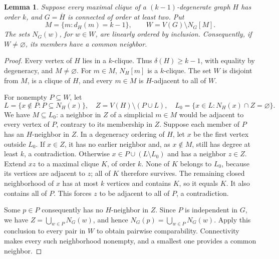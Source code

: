\documentclass[11pt,a4paper]{article}
\newtheorem{lemma}[theorem]{Lemma}
\theoremstyle{definition}\newtheorem{definition}[theorem]{Definition}
\theoremstyle{remark}\newtheorem{remark}[theorem]{Remark}
\begin{document}
\begin{lemma}
\label{early:lem:nested}
Suppose every maximal clique of a $(k-1)$-degenerate graph $H$ has order
$k$, and $G=\overline H$ is connected of order at least two.  Put
\[
 M=\{m:d_H(m)=k-1\},\qquad W=V(G)\setminus N_G[M].
\]
The sets $N_G(w)$, for $w\in W$, are linearly ordered by inclusion.
Consequently, if $W\ne\varnothing$, its members have a common neighbor.
\end{lemma}
\begin{proof}
Every vertex of $H$ lies in a $k$-clique.  Thus $\delta(H)\geq k-1$,
with equality by degeneracy, and $M\ne\varnothing$.  For $m\in M$,
$N_H[m]$ is a $k$-clique.  The set $W$ is disjoint from $M$, is a clique
of $H$, and every $m\in M$ is $H$-adjacent to all of $W$.

For nonempty $P\subseteq W$, let
\[
 L=\{x\notin P:P\subseteq N_H(x)\},\quad
 Z=V(H)\setminus(P\cup L),\quad
 L_0=\{x\in L:N_H(x)\cap Z=\varnothing\}.
\]
We have $M\subseteq L_0$: a neighbor in $Z$ of a simplicial $m\in M$
would be adjacent to every vertex of $P$, contrary to its membership in
$Z$.  Suppose each member of $P$ has an $H$-neighbor in $Z$.  In a
degeneracy ordering of $H$, let $x$ be the first vertex outside $L_0$.
If $x\in Z$, it has no earlier neighbor and, as $x\notin M$, still has
degree at least $k$, a contradiction.  Otherwise
$x\in P\cup(L\setminus L_0)$ and has a neighbor $z\in Z$.  Extend
$xz$ to a maximal clique $K$, of order $k$.  None of $K$ belongs to
$L_0$, because its vertices are adjacent to $z$; all of $K$ therefore
survives.  The remaining closed neighborhood of $x$ has at most $k$
vertices and contains $K$, so it equals $K$.  It also contains all of
$P$.  This forces $z$ to be adjacent to all of $P$, a contradiction.

Some $p\in P$ consequently has no $H$-neighbor in $Z$.  Since $P$ is
independent in $G$, we have $Z=\bigcup_{w\in P}N_G(w)$, and hence
$N_G(p)=\bigcup_{w\in P}N_G(w)$.  Apply this conclusion to every pair
in $W$ to obtain pairwise comparability.  Connectivity makes every such
neighborhood nonempty, and a smallest one provides a common neighbor.
\end{proof}
\end{document}

